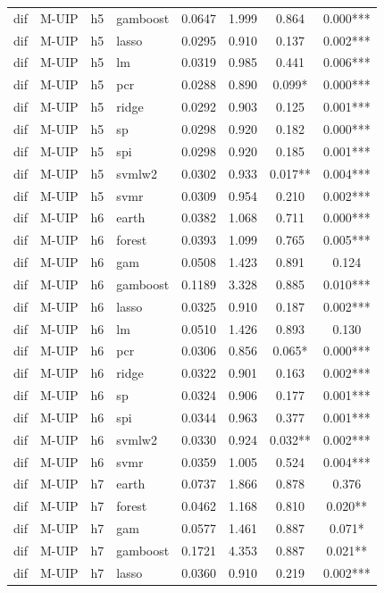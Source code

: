 \begin{ThreePartTable}
\begin{longtable}[t]{llclcccc}
dif & M-UIP & h5 & gamboost & 0.0647 & 1.999 & 0.864 & 0.000***\\
dif & M-UIP & h5 & lasso & 0.0295 & 0.910 & 0.137 & 0.002***\\
dif & M-UIP & h5 & lm & 0.0319 & 0.985 & 0.441 & 0.006***\\
dif & M-UIP & h5 & pcr & 0.0288 & 0.890 & 0.099* & 0.000***\\
dif & M-UIP & h5 & ridge & 0.0292 & 0.903 & 0.125 & 0.001***\\
dif & M-UIP & h5 & sp & 0.0298 & 0.920 & 0.182 & 0.000***\\
dif & M-UIP & h5 & spi & 0.0298 & 0.920 & 0.185 & 0.001***\\
dif & M-UIP & h5 & svmlw2 & 0.0302 & 0.933 & 0.017** & 0.004***\\
dif & M-UIP & h5 & svmr & 0.0309 & 0.954 & 0.210 & 0.002***\\
\addlinespace
dif & M-UIP & h6 & earth & 0.0382 & 1.068 & 0.711 & 0.000***\\
dif & M-UIP & h6 & forest & 0.0393 & 1.099 & 0.765 & 0.005***\\
dif & M-UIP & h6 & gam & 0.0508 & 1.423 & 0.891 & 0.124\\
dif & M-UIP & h6 & gamboost & 0.1189 & 3.328 & 0.885 & 0.010***\\
dif & M-UIP & h6 & lasso & 0.0325 & 0.910 & 0.187 & 0.002***\\
dif & M-UIP & h6 & lm & 0.0510 & 1.426 & 0.893 & 0.130\\
dif & M-UIP & h6 & pcr & 0.0306 & 0.856 & 0.065* & 0.000***\\
dif & M-UIP & h6 & ridge & 0.0322 & 0.901 & 0.163 & 0.002***\\
dif & M-UIP & h6 & sp & 0.0324 & 0.906 & 0.177 & 0.001***\\
dif & M-UIP & h6 & spi & 0.0344 & 0.963 & 0.377 & 0.001***\\
dif & M-UIP & h6 & svmlw2 & 0.0330 & 0.924 & 0.032** & 0.002***\\
dif & M-UIP & h6 & svmr & 0.0359 & 1.005 & 0.524 & 0.004***\\
\addlinespace
dif & M-UIP & h7 & earth & 0.0737 & 1.866 & 0.878 & 0.376\\
dif & M-UIP & h7 & forest & 0.0462 & 1.168 & 0.810 & 0.020**\\
dif & M-UIP & h7 & gam & 0.0577 & 1.461 & 0.887 & 0.071*\\
dif & M-UIP & h7 & gamboost & 0.1721 & 4.353 & 0.887 & 0.021**\\
dif & M-UIP & h7 & lasso & 0.0360 & 0.910 & 0.219 & 0.002***\\

\end{longtable}
\end{ThreePartTable}
